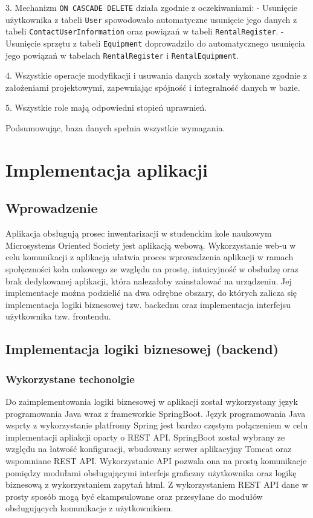 \documentclass{article}
\begin{document}
3. Mechanizm \texttt{ON CASCADE DELETE} działa zgodnie z oczekiwaniami:
   - Usunięcie użytkownika z tabeli \texttt{User} spowodowało automatyczne usunięcie jego danych z tabeli \texttt{ContactUserInformation} oraz powiązań w tabeli \texttt{RentalRegister}.
   - Usunięcie sprzętu z tabeli \texttt{Equipment} doprowadziło do automatycznego usunięcia jego powiązań w tabelach \texttt{RentalRegister} i \texttt{RentalEquipment}.

4. Wszystkie operacje modyfikacji i usuwania danych zostały wykonane zgodnie z założeniami projektowymi, zapewniając spójność i integralność danych w bazie.

5. Wszystkie role mają odpowiedni stopień uprawnień.


Podsumowując, baza danych spełnia wszystkie wymagania.

\section{\textbf{Implementacja aplikacji}}

\subsection{\textbf{Wprowadzenie}}

Aplikacja obsługują prosec inwentarizacji w studenckim kole naukowym Microsystems Oriented Society jest aplikacją webową. Wykorzystanie web-u w celu komunikacji
z aplikacją ułatwia proces wprowadzenia aplikacji w ramach społęczności koła nukowego ze względu na prostę, intuicyjność w obsłudzę oraz brak dedykowanej aplikacji, która nalezałoby zainstalować na urządzeniu.
Jej implementacje można podzielić na dwa odrębne obszary, do których zalicza się implementacja logiki biznesowej tzw. backednu  oraz implementacja interfejsu użytkownika tzw. frontendu.


\subsection{\textbf{Implementacja logiki biznesowej (backend)}}

\subsubsection{Wykorzystane techonolgie}

Do zaimplementowania logiki biznesowej w aplikacji został wykorzystany język programowania Java wraz z frameworkie SpringBoot. Język programowania Java wsprty z wykorzystanie platfromy
Spring jest bardzo częstym połączeniem w celu implementacji apliakcji oparty o REST API. SpringBoot został wybrany ze względu na łatwość konfiguracji, wbudowany serwer aplikacyjny Tomcat oraz wspomniane REST API.
Wykorzystanie API pozwala ona na prostą komunikacje pomiędzy modułami obsługującymi interfejs graficzny użytkownika 
oraz logikę biznesową z wykorzystaniem zapytań html. Z wykorzystaniem REST API dane w prosty sposób mogą być ekampsulowane oraz przesyłane do modułów obsługujących komunikacje z użytkownikiem.
\end{document}
